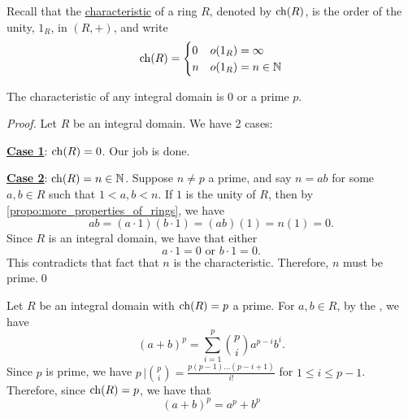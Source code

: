Recall that the \hyperref[defn:characteristic_of_a_ring]{characteristic} of a ring $R$, denoted by $\operatorname{ch}(R)$, is the order of the unity, $1_R$, in $(R, +)$, and write
\begin{equation*}
  \operatorname{ch}(R) = \begin{cases}
    0 & o(1_R) = \infty \\
    n & o(1_R) = n \in \mathbb{N}
  \end{cases}
\end{equation*}

\begin{propo}
\label{propo:integral_domains_have_zero_or_prime_characteristics}
  The characteristic of any integral domain is $0$ or a prime $p$.
\end{propo}

\begin{proof}
  Let $R$ be an integral domain. We have 2 cases:

  \noindent \underline{\textbf{Case 1}}: $\operatorname{ch}(R) = 0$. Our job is done.
  
  \noindent \underline{\textbf{Case 2}}: $\operatorname{ch}(R) = n \in \mathbb{N}$. Suppose $n \neq p$ a prime, and say $n = ab$ for some $a, b \in R$ such that $1 < a, b < n$. If $1$ is the unity of $R$, then by \cref{propo:more_properties_of_rings}, we have
  \begin{equation*}
    ab = (a \cdot 1)(b \cdot 1) = (ab) (1) = n (1) = 0.
  \end{equation*}
  Since $R$ is an integral domain, we have that either
  \begin{equation*}
    a \cdot 1 = 0 \text{ or } b \cdot 1 = 0.
  \end{equation*}
  This contradicts that fact that $n$ is the characteristic. Therefore, $n$ must be prime.\qed
\end{proof}

\begin{note}
  Let $R$ be an integral domain with $\operatorname{ch}(R) = p$ a prime. For $a, b \in R$, by the , we have
  \begin{equation*}
    (a + b)^p = \sum_{i=1}^{p} \binom{p}{i} a^{p - i} b^i.
  \end{equation*}
  Since $p$ is prime, we have $p \, | \binom{p}{i} = \frac{p(p-1)\hdots(p-i+1)}{i!}$ for $1 \leq i \leq p - 1$. Therefore, since $\operatorname{ch}(R) = p$, we have that
  \begin{equation*}
    (a + b)^p = a^p + b^p
  \end{equation*}
\end{note}



